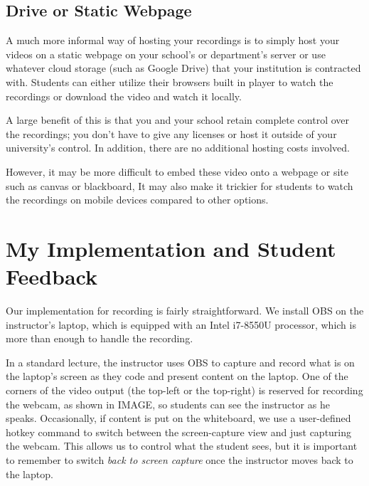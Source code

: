 \documentclass[sigconf]{acmart}
\begin{document}
\subsection{Drive or Static Webpage}
A much more informal way of hosting your recordings is to simply host your videos on a static webpage on your school's or department's server or use whatever cloud storage (such as Google Drive) that your institution is contracted with.
Students can either utilize their browsers built in player to watch the recordings or download the video and watch it locally.

A large benefit of this is that you and your school retain complete control over the recordings; you don't have to give any licenses or host it outside of your university's control.
In addition, there are no additional hosting costs involved.

However, it may be more difficult to embed these video onto a webpage or site such as canvas or blackboard, 
It may also make it trickier for students to watch the recordings on mobile devices compared to other options.


%
%
%


\section{My Implementation and Student Feedback}

Our implementation for recording is fairly straightforward.
We install OBS \cite{bailey2017open} on the instructor's laptop, which is equipped with an Intel i7-8550U processor, which is more than enough to handle the recording.

In a standard lecture, the instructor uses OBS to capture and record what is on the laptop's screen as they code and present content on the laptop.
One of the corners of the video output (the top-left or the top-right) is reserved for recording the webcam, as shown in IMAGE, so students can see the instructor as he speaks.
Occasionally, if content is put on the whiteboard, we use a user-defined hotkey command to switch between the screen-capture view and just capturing the webcam.
This allows us to control what the student sees, but it is important to remember to switch \textit{back to screen capture} once the instructor moves back to the laptop.  
\end{document}
